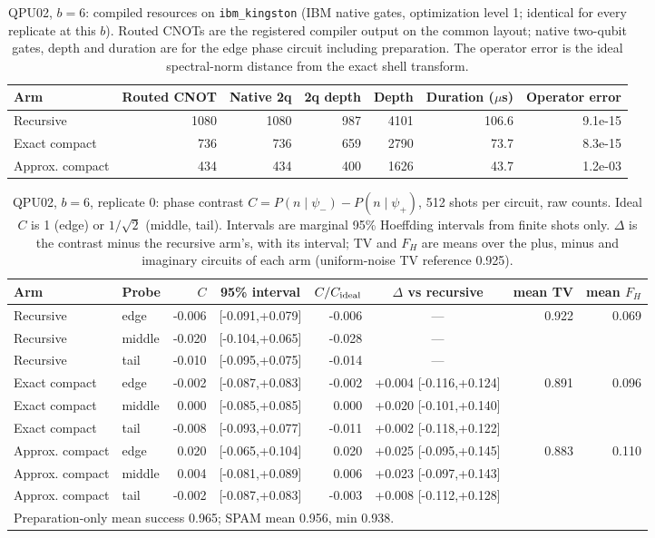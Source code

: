 \begin{table}[htbp]\centering\small
\caption{QPU02, $b=6$: compiled resources on \texttt{ibm\_kingston} (IBM native gates, optimization level 1; identical for every replicate at this $b$). Routed CNOTs are the registered compiler output on the common layout; native two-qubit gates, depth and duration are for the edge phase circuit including preparation. The operator error is the ideal spectral-norm distance from the exact shell transform.}\label{tab:q2res-b6}
\begin{tabular}{lrrrrrr}\toprule Arm & Routed CNOT & Native 2q & 2q depth & Depth & Duration ($\mu$s) & Operator error\\\midrule
Recursive & 1080 & 1080 & 987 & 4101 & 106.6 & 9.1e-15\\
Exact compact & 736 & 736 & 659 & 2790 & 73.7 & 8.3e-15\\
Approx. compact & 434 & 434 & 400 & 1626 & 43.7 & 1.2e-03\\
\bottomrule\end{tabular}\end{table}

\begin{table}[htbp]\centering\scriptsize\setlength{\tabcolsep}{3pt}
\caption{QPU02, $b=6$, replicate 0: phase contrast $C=P(n\mid\psi_-)-P(n\mid\psi_+)$, 512 shots per circuit, raw counts. Ideal $C$ is 1 (edge) or $1/\sqrt2$ (middle, tail). Intervals are marginal 95\% Hoeffding intervals from finite shots only. $\Delta$ is the contrast minus the recursive arm's, with its interval; TV and $F_H$ are means over the plus, minus and imaginary circuits of each arm (uniform-noise TV reference 0.925).}\label{tab:q2c-b6r0}
\begin{tabular}{llrcrcrr}\toprule Arm & Probe & $C$ & 95\% interval & $C/C_{\rm ideal}$ & $\Delta$ vs recursive & mean TV & mean $F_H$\\\midrule
Recursive & edge & -0.006 & [-0.091,+0.079] & -0.006 & --- & 0.922 & 0.069\\
Recursive & middle & -0.020 & [-0.104,+0.065] & -0.028 & --- &  & \\
Recursive & tail & -0.010 & [-0.095,+0.075] & -0.014 & --- &  & \\
\midrule
Exact compact & edge & -0.002 & [-0.087,+0.083] & -0.002 & +0.004 [-0.116,+0.124] & 0.891 & 0.096\\
Exact compact & middle & 0.000 & [-0.085,+0.085] & 0.000 & +0.020 [-0.101,+0.140] &  & \\
Exact compact & tail & -0.008 & [-0.093,+0.077] & -0.011 & +0.002 [-0.118,+0.122] &  & \\
\midrule
Approx. compact & edge & 0.020 & [-0.065,+0.104] & 0.020 & +0.025 [-0.095,+0.145] & 0.883 & 0.110\\
Approx. compact & middle & 0.004 & [-0.081,+0.089] & 0.006 & +0.023 [-0.097,+0.143] &  & \\
Approx. compact & tail & -0.002 & [-0.087,+0.083] & -0.003 & +0.008 [-0.112,+0.128] &  & \\
\multicolumn{8}{l}{Preparation-only mean success 0.965; SPAM mean 0.956, min 0.938.}\\
\bottomrule\end{tabular}\end{table}


